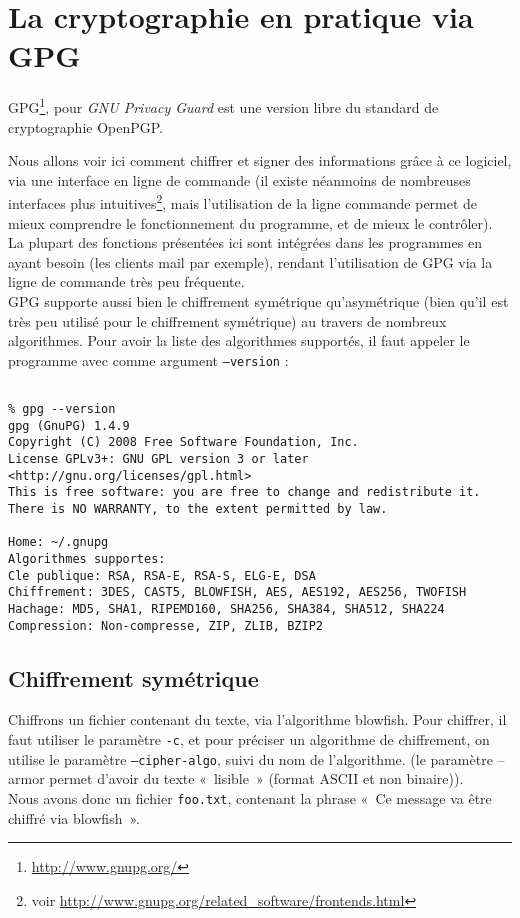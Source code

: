 \chapter{La cryptographie en pratique via GPG}
GPG\footnote{\url{http://www.gnupg.org/}}, pour 
\emph{GNU Privacy Guard} est une version libre du
standard de cryptographie OpenPGP.

Nous allons voir ici comment chiffrer et signer des informations 
grâce à ce
logiciel, via une interface en ligne de commande (il existe
néanmoins de nombreuses interfaces plus intuitives\footnote{voir
\url{http://www.gnupg.org/related_software/frontends.html}}, mais
l'utilisation de la ligne commande permet de mieux comprendre le
fonctionnement du programme, et de mieux le contrôler).
La plupart des fonctions présentées ici sont intégrées dans les
programmes en ayant besoin (les clients mail par exemple), rendant
l'utilisation de GPG via la ligne de commande très peu fréquente.
\\

GPG supporte aussi bien le chiffrement symétrique qu'asymétrique
(bien qu'il est très peu utilisé pour le chiffrement symétrique)
au travers de nombreux algorithmes. Pour avoir la liste des
algorithmes supportés, il faut appeler le programme avec comme
argument \texttt{--version} : 

\lstset{language=bash}
\begin{lstlisting}

% gpg --version 
gpg (GnuPG) 1.4.9
Copyright (C) 2008 Free Software Foundation, Inc.
License GPLv3+: GNU GPL version 3 or later
<http://gnu.org/licenses/gpl.html>
This is free software: you are free to change and redistribute it.
There is NO WARRANTY, to the extent permitted by law.

Home: ~/.gnupg
Algorithmes supportes:
Cle publique: RSA, RSA-E, RSA-S, ELG-E, DSA
Chiffrement: 3DES, CAST5, BLOWFISH, AES, AES192, AES256, TWOFISH
Hachage: MD5, SHA1, RIPEMD160, SHA256, SHA384, SHA512, SHA224
Compression: Non-compresse, ZIP, ZLIB, BZIP2
\end{lstlisting}

\section{Chiffrement symétrique}
Chiffrons un fichier contenant du texte, via l'algorithme
blowfish. Pour chiffrer, il faut utiliser le paramètre
\texttt{-c}, et pour préciser un algorithme de chiffrement, on
utilise le paramètre \texttt{--cipher-algo}, suivi du nom de
l'algorithme. (le paramètre
--armor permet d'avoir du texte «~lisible~» (format ASCII et non
binaire)).
\\
Nous avons donc un fichier \texttt{foo.txt}, contenant la phrase
«~Ce message va être chiffré via blowfish~».

